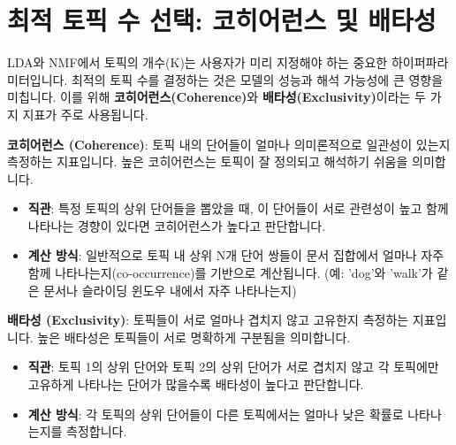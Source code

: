 \documentclass[11pt,a4paper]{article}
\begin{document}
\newpage
\section*{최적 토픽 수 선택: 코히어런스 및 배타성}
LDA와 NMF에서 토픽의 개수(K)는 사용자가 미리 지정해야 하는 중요한 하이퍼파라미터입니다. 최적의 토픽 수를 결정하는 것은 모델의 성능과 해석 가능성에 큰 영향을 미칩니다. 이를 위해 \textbf{코히어런스(Coherence)}와 \textbf{배타성(Exclusivity)}이라는 두 가지 지표가 주로 사용됩니다.

\begin{conceptbox}
\textbf{코히어런스 (Coherence)}:
토픽 내의 단어들이 얼마나 의미론적으로 일관성이 있는지 측정하는 지표입니다.
높은 코히어런스는 토픽이 잘 정의되고 해석하기 쉬움을 의미합니다.
\end{conceptbox}

\begin{itemize}
    \item \textbf{직관}: 특정 토픽의 상위 단어들을 뽑았을 때, 이 단어들이 서로 관련성이 높고 함께 나타나는 경향이 있다면 코히어런스가 높다고 판단합니다.
    \item \textbf{계산 방식}: 일반적으로 토픽 내 상위 N개 단어 쌍들이 문서 집합에서 얼마나 자주 함께 나타나는지(co-occurrence)를 기반으로 계산됩니다. (예: 'dog'와 'walk'가 같은 문서나 슬라이딩 윈도우 내에서 자주 나타나는지)
\end{itemize}

\begin{conceptbox}
\textbf{배타성 (Exclusivity)}:
토픽들이 서로 얼마나 겹치지 않고 고유한지 측정하는 지표입니다.
높은 배타성은 토픽들이 서로 명확하게 구분됨을 의미합니다.
\end{conceptbox}

\begin{itemize}
    \item \textbf{직관}: 토픽 1의 상위 단어와 토픽 2의 상위 단어가 서로 겹치지 않고 각 토픽에만 고유하게 나타나는 단어가 많을수록 배타성이 높다고 판단합니다.
    \item \textbf{계산 방식}: 각 토픽의 상위 단어들이 다른 토픽에서는 얼마나 낮은 확률로 나타나는지를 측정합니다.
\end{itemize}
\end{document}
